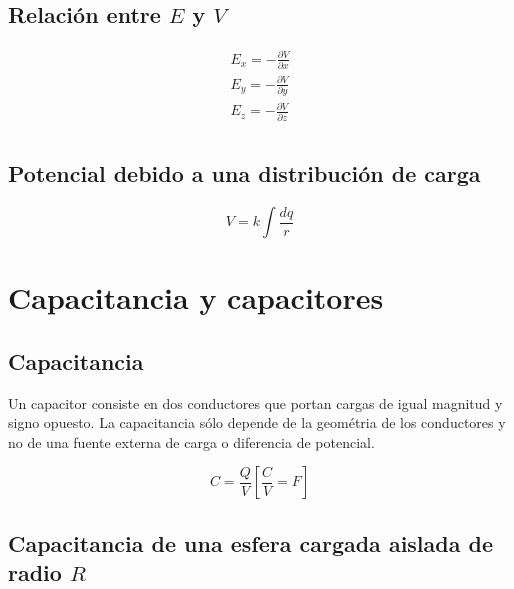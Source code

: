 \documentclass{report}
\begin{document}
    \subsection*{Relación entre $E$ y $V$}

      \begin{align*}
        E_x=-\frac{\partial V}{\partial x}\\
        E_y=-\frac{\partial V}{\partial y}\\
        E_z=-\frac{\partial V}{\partial z}\\
      \end{align*}

    \subsection*{Potencial debido a una distribución de carga}

      \begin{equation*}
        V=k\int\frac{dq}{r}
      \end{equation*}

  \section*{Capacitancia y capacitores}

    \subsection*{Capacitancia}
      Un capacitor consiste en dos conductores que portan cargas de igual 
      magnitud y signo opuesto. La capacitancia sólo depende de la geométria 
      de los conductores y no de una fuente externa de carga o diferencia de 
      potencial.

      \begin{equation*}
        C=\frac{Q}{V}\left[\frac{C}{V}=F\right]
      \end{equation*}

    \subsection*{Capacitancia de una esfera cargada aislada de radio $R$}
\end{document}
